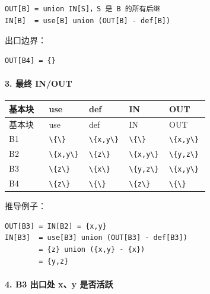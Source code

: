 \documentclass[UTF8]{ctexart}
\begin{document}
\begin{Verbatim}[fontsize=\small,breaklines=true]
OUT[B] = union IN[S]，S 是 B 的所有后继
IN[B]  = use[B] union (OUT[B] - def[B])
\end{Verbatim}

出口边界：

\begin{Verbatim}[fontsize=\small,breaklines=true]
OUT[B4] = {}
\end{Verbatim}

\paragraph*{3. 最终 IN/OUT}

\begin{longtable}{|p{0.19\linewidth}|p{0.19\linewidth}|p{0.19\linewidth}|p{0.19\linewidth}|p{0.19\linewidth}|}
\hline
基本块 & use & def & IN & OUT \\
\hline
\endfirsthead
基本块 & use & def & IN & OUT \\
\hline
\endhead
B1 & \texttt{\textbackslash{}\{\textbackslash{}\}} & \texttt{\textbackslash{}\{x,y\textbackslash{}\}} & \texttt{\textbackslash{}\{\textbackslash{}\}} & \texttt{\textbackslash{}\{x,y\textbackslash{}\}} \\
\hline
B2 & \texttt{\textbackslash{}\{x,y\textbackslash{}\}} & \texttt{\textbackslash{}\{z\textbackslash{}\}} & \texttt{\textbackslash{}\{x,y\textbackslash{}\}} & \texttt{\textbackslash{}\{y,z\textbackslash{}\}} \\
\hline
B3 & \texttt{\textbackslash{}\{z\textbackslash{}\}} & \texttt{\textbackslash{}\{x\textbackslash{}\}} & \texttt{\textbackslash{}\{y,z\textbackslash{}\}} & \texttt{\textbackslash{}\{x,y\textbackslash{}\}} \\
\hline
B4 & \texttt{\textbackslash{}\{z\textbackslash{}\}} & \texttt{\textbackslash{}\{\textbackslash{}\}} & \texttt{\textbackslash{}\{z\textbackslash{}\}} & \texttt{\textbackslash{}\{\textbackslash{}\}} \\
\hline
\end{longtable}

推导例子：

\begin{Verbatim}[fontsize=\small,breaklines=true]
OUT[B3] = IN[B2] = {x,y}
IN[B3]  = use[B3] union (OUT[B3] - def[B3])
        = {z} union ({x,y} - {x})
        = {y,z}
\end{Verbatim}

\paragraph*{4. B3 出口处 x、y 是否活跃}
\end{document}
